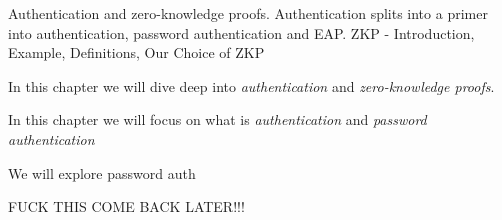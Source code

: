 Authentication and zero-knowledge proofs.
Authentication splits into a primer into authentication, password authentication and EAP.
ZKP - Introduction, Example, Definitions, Our Choice of ZKP

In this chapter we will dive deep into \textit{authentication} and \textit{zero-knowledge proofs}.

In this chapter we will focus on what is \textit{authentication} and \textit{password authentication}

We will explore password auth


FUCK THIS COME BACK LATER!!!
